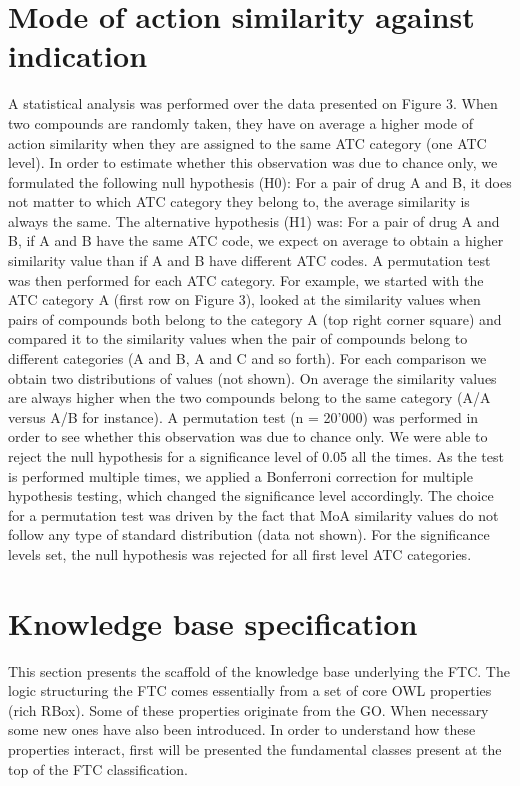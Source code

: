 \documentclass{bioinfo}
\begin{document}
\section{Mode of action similarity against indication}
A statistical analysis was performed over the data presented on Figure 3. 
When two compounds are randomly taken, they have on average a higher mode of action similarity when 
they are assigned to the same ATC category (one ATC level). In order to estimate whether this observation was 
due to chance only, we formulated the following null hypothesis (H0): For a pair of drug A and B, it does not 
matter to which ATC category they belong to, the average similarity is always the same. 
The alternative hypothesis (H1) was: For a pair of drug A and B, if A and B have the same ATC code, 
we expect on average to obtain a higher similarity value than if A and B have different ATC codes. 
A permutation test was then performed for each ATC category. For example, we started with the ATC 
category A (first row on Figure 3), looked at the similarity values when pairs of compounds both belong 
to the category A (top right corner square) and compared it to the similarity values when the pair of compounds 
belong to different categories (A and B, A and C and so forth). For each comparison we obtain two distributions of 
values (not shown). On average the similarity values are always higher when the two compounds 
belong to the same category (A/A versus A/B for instance). A permutation test (n = 20'000) was 
performed in order to see whether this observation was due to chance only. We were able to reject the null 
hypothesis for a significance level of 0.05 all the times. As the test is performed multiple times, 
we applied a Bonferroni correction for multiple hypothesis testing, which changed the significance level accordingly. 
The choice for a permutation test was driven by the fact that MoA similarity values do not follow any type 
of standard distribution (data not shown). For the significance levels set, the null hypothesis was rejected for 
all first level ATC categories.


\section{Knowledge base specification}
This section presents the scaffold of the knowledge base underlying the FTC. 
The logic structuring the FTC comes essentially from a set of core OWL properties (rich RBox). 
Some of these properties originate from the GO. When necessary some new ones have also been introduced. 
In order to understand how these properties interact, first will be presented the fundamental classes present 
at the top of the FTC classification.
\end{document}
